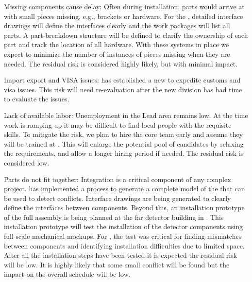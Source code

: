 Missing components cause delay:
Often during  installation, parts would arrive at  with small pieces  missing, e.g., brackets or hardware. For the , detailed interface drawings will %
define the interfaces clearly and the work packages will %
list all parts. A part-breakdown structure will be defined to clarify %
the ownership of each part %
and track the location of all hardware. %
With these systems in place we expect to minimize the number of instances %
of pieces missing when they are needed. %
The residual risk is considered  highly likely, but with minimal impact.

Import export and VISA issues:
 has established a new  to expedite customs and visa issues. This risk will need re-evaluation after the new division has had time to evaluate the issues.

Lack of available labor:
Unemployment in the Lead area remains low. At the time work is ramping up it may be difficult to find local people with the requisite skills. To mitigate the risk, we plan to hire the core team early and assume they will be trained at .  This will enlarge the potential %
pool of candidates by relaxing the requirements,  and allow a longer hiring period if needed. The residual risk is considered low.

Parts do not fit together:
Integration is a critical component of any complex project.  has implemented a process to generate a complete \threed model of the  that can be used to detect conflicts. Interface drawings are being generated to clearly define the interfaces between components. Beyond this, an installation prototype of the full assembly is being planned at the  far detector building in . This installation prototype will test the installation of the detector components using full-scale mechanical mockups. For , the  test was critical for finding mismatches between components and identifying installation difficulties %
due to limited space. After all the installation steps have been tested it is expected the residual risk will be low. It is highly likely that some small conflict will be found but the impact on the overall schedule will be low.


